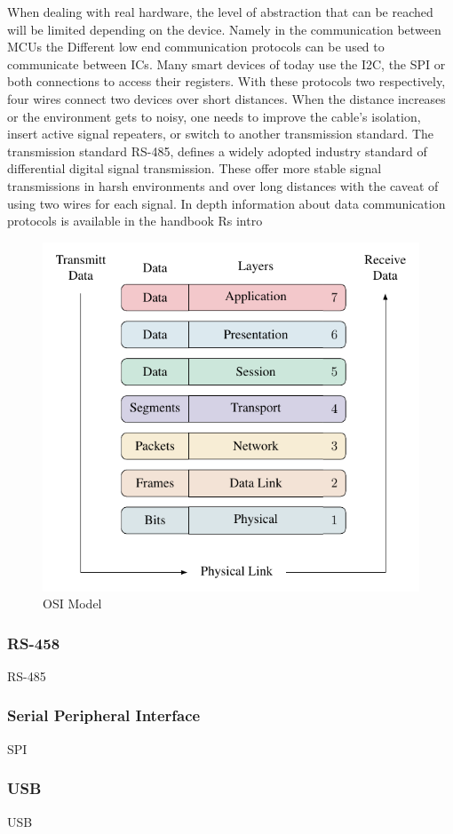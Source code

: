 When dealing with real hardware, the level of abstraction that can be reached will be limited depending on the device. Namely in the communication between \ac{MCU}s the
Different low end communication protocols can be used to communicate between \ac{IC}s. Many smart devices of today use the \acf{I2C}, the \acf{SPI} or both connections to access their registers. With these protocols two respectively, four wires connect two devices over short distances. When the distance increases or the environment gets to noisy, one needs to improve the cable's isolation, insert active signal repeaters, or switch to another transmission standard.
The transmission standard \acs{RS}-485, defines a widely adopted industry standard of differential digital signal transmission. These offer more stable signal transmissions in harsh environments and over long distances with the caveat of using two wires for each signal.
In depth information about data communication protocols is available in the handbook \cite{buchanan2004handbook}
Rs intro \cite{marais2008rs}

\begin{figure}[!htb]
  \centering
  \includegraphics[scale=1]{figures/data_transmission/osi_model/osi_model}
  \caption[OSI Model]{OSI Model%
  \label{fig:osi_model}}
\end{figure}

\subsubsection{RS-458}
\ac{RS}-485
\subsubsection{Serial Peripheral Interface}
\ac{SPI}
\subsubsection{USB}
\ac{USB}
